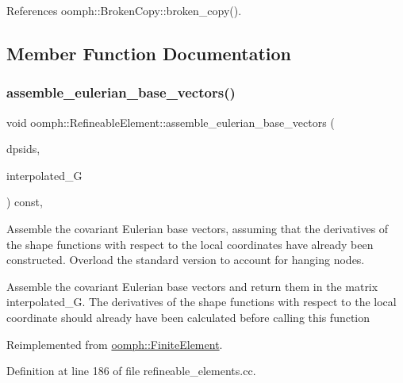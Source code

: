 References oomph\+::\+Broken\+Copy\+::broken\+\_\+copy().



\subsection{Member Function Documentation}
\mbox{\label{classoomph_1_1RefineableElement_abd80668ecabd71ea8d992cfaabb6633c}} 
\subsubsection{\texorpdfstring{assemble\+\_\+eulerian\+\_\+base\+\_\+vectors()}{assemble\_eulerian\_base\_vectors()}}
{\footnotesize\ttfamily void oomph\+::\+Refineable\+Element\+::assemble\+\_\+eulerian\+\_\+base\+\_\+vectors (\begin{DoxyParamCaption}\item[{const \hyperlink{classoomph_1_1DShape}{D\+Shape} \&}]{dpsids,  }\item[{\hyperlink{classoomph_1_1DenseMatrix}{Dense\+Matrix}$<$ double $>$ \&}]{interpolated\+\_\+G }\end{DoxyParamCaption}) const\hspace{0.3cm}{\ttfamily [protected]}, {\ttfamily [virtual]}}



Assemble the covariant Eulerian base vectors, assuming that the derivatives of the shape functions with respect to the local coordinates have already been constructed. Overload the standard version to account for hanging nodes. 

Assemble the covariant Eulerian base vectors and return them in the matrix interpolated\+\_\+G. The derivatives of the shape functions with respect to the local coordinate should already have been calculated before calling this function 

Reimplemented from \hyperlink{classoomph_1_1FiniteElement_aa595f0f0672996c376073cf468b656d1}{oomph\+::\+Finite\+Element}.



Definition at line 186 of file refineable\+\_\+elements.\+cc.



